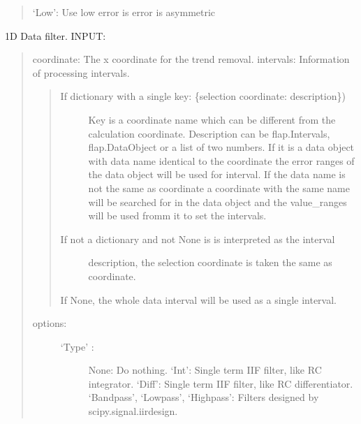 \documentclass[letterpaper,10pt,english]{sphinxmanual}
\begin{document}
\begin{fulllineitems}
\begin{fulllineitems}
\begin{quote}
‘Low’: Use low error is error is asymmetric
\end{quote}

\end{fulllineitems}


\begin{fulllineitems}
\label{\detokenize{data_object:flap.data_object.DataObject.filter_data}}
1D Data filter.
INPUT:
\begin{quote}

coordinate: The x coordinate for the trend removal.
intervals: Information of processing intervals.
\begin{quote}
\begin{description}
\item[{If dictionary with a single key: \{selection coordinate: description\})}] \leavevmode
Key is a coordinate name which can be different from the calculation
coordinate.
Description can be flap.Intervals, flap.DataObject or
a list of two numbers. If it is a data object with data name identical to
the coordinate the error ranges of the data object will be used for
interval. If the data name is not the same as coordinate a coordinate with the
same name will be searched for in the data object and the value\_ranges
will be used fromm it to set the intervals.

\item[{If not a dictionary and not None is is interpreted as the interval}] \leavevmode
description, the selection coordinate is taken the same as
coordinate.

\end{description}

If None, the whole data interval will be used as a single interval.
\end{quote}
\begin{description}
\item[{options:}] \leavevmode\begin{description}
\item[{‘Type’ :}] \leavevmode
None: Do nothing.
‘Int’: Single term IIF filter, like RC integrator.
‘Diff’: Single term IIF filter, like RC differentiator.
‘Bandpass’, ‘Lowpass’, ‘Highpass’: Filters designed by scipy.signal.iirdesign.
\begin{quote}
\begin{quote}


\end{quote}
\end{quote}
\end{description}
\end{description}
\end{quote}
\end{fulllineitems}
\end{fulllineitems}
\end{document}
